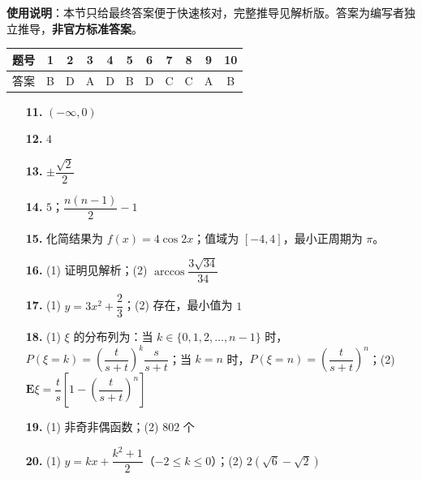 
\begin{gknotice}
\textbf{使用说明}：本节只给最终答案便于快速核对，完整推导见解析版。答案为编写者独立推导，\textbf{非官方标准答案}。
\end{gknotice}

\begin{center}\begin{tabular}{ccccccccccc}
\toprule
题号 & 1 & 2 & 3 & 4 & 5 & 6 & 7 & 8 & 9 & 10 \\
\midrule
答案 & B & D & A & D & B & D & C & C & A & B \\
\bottomrule
\end{tabular}\end{center}

\begin{itemize}[leftmargin=2.6em]
  \item[\textbf{11.}] $(-\infty, 0)$
  \item[\textbf{12.}] $4$
  \item[\textbf{13.}] $\pm \dfrac{\sqrt{2}}{2}$
  \item[\textbf{14.}] $5$；$\dfrac{n(n-1)}{2} - 1$
\end{itemize}

\begin{itemize}[leftmargin=2.6em]
  \item[\textbf{15.}] 化简结果为 $f(x) = 4\cos 2x$；值域为 $[-4, 4]$，最小正周期为 $\pi$。
  \item[\textbf{16.}] (1) 证明见解析；(2) $\arccos\dfrac{3\sqrt{34}}{34}$
  \item[\textbf{17.}] (1) $y = 3x^2 + \dfrac{2}{3}$；(2) 存在，最小值为 $1$
  \item[\textbf{18.}] (1) $\xi$ 的分布列为：当 $k \in \{0, 1, 2, \dots, n-1\}$ 时，$P(\xi = k) = \left(\dfrac{t}{s+t}\right)^k \dfrac{s}{s+t}$；当 $k = n$ 时，$P(\xi = n) = \left(\dfrac{t}{s+t}\right)^n$；(2) $\mathbf{E}\xi = \dfrac{t}{s}\left[1 - \left(\dfrac{t}{s+t}\right)^n\right]$
  \item[\textbf{19.}] (1) 非奇非偶函数；(2) $802$ 个
  \item[\textbf{20.}] (1) $y = kx + \dfrac{k^2+1}{2}$（$-2 \leqslant k \leqslant 0$）；(2) $2(\sqrt{6} - \sqrt{2})$
\end{itemize}
